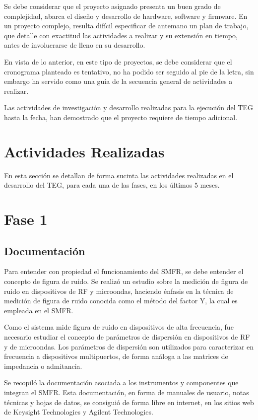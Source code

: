 \documentclass[paper=letter,oneside,fontsize=12pt, parskip=full]{article}
\begin{document}
	Se debe considerar que el proyecto asignado presenta un buen grado de complejidad, 
	abarca el diseño y desarrollo de hardware, software y firmware. En un proyecto complejo, resulta difícil especificar de antemano un plan de trabajo, que detalle con exactitud las actividades a realizar y su extensión en tiempo, antes de involucrarse de lleno en su desarrollo. 
	
	En vista de lo anterior, en este tipo de proyectos, se debe considerar que el cronograma planteado es tentativo, no ha podido ser seguido al pie de la letra, sin embargo ha servido como una guía de la secuencia general de actividades a realizar.

	Las actividades de investigación y desarrollo realizadas para la ejecución del TEG hasta la fecha, han demostrado que el proyecto requiere de tiempo adicional.	

	\section{Actividades Realizadas}
	
	En esta sección se detallan de forma sucinta las actividades realizadas en el desarrollo del TEG, para cada una de las fases, en los últimos 5 meses.
	
	\section{Fase 1}
	
	\subsection{Documentación}
	Para entender con propiedad el funcionamiento del SMFR, se debe entender el concepto de figura de ruido. Se realizó un estudio sobre la medición de figura de ruido en dispositivos de RF y microondas, haciendo énfasis en la técnica de medición de figura de ruido conocida como el método del factor Y, la cual es empleada en el SMFR.
	
	Como el sistema mide figura de ruido en dispositivos de alta frecuencia, fue necesario estudiar el concepto de parámetros de dispersión en dispositivos de RF y de microondas. Los parámetros de dispersión son utilizados para caracterizar en frecuencia a dispositivos multipuertos, de forma análoga a las matrices de impedancia o admitancia.
	
	Se recopiló la documentación asociada a los instrumentos y componentes que integran el SMFR. Esta documentación, en forma de manuales de usuario, notas técnicas y hojas de datos, se consiguió de forma libre en internet, en los sitios web de Keysight Technologies y Agilent Technologies. 	
	
\end{document}
